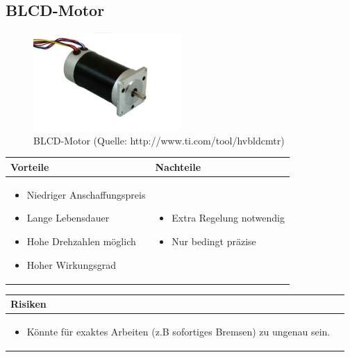 \pagebreak

\subsection{BLCD-Motor}

\begin{figure}[h!]%
\centering
\includegraphics[width=0.5\textwidth]{fig/blcd.jpg}
\caption{BLCD-Motor (Quelle: http://www.ti.com/tool/hvbldcmtr)}
\label{fig:Java}
\end{figure}

\begin{table}[h]
\begin{tabular}{p{} | p{}}


 \textbf{Vorteile} & \textbf{Nachteile} \\ \hline
	 
\begin{itemize}
\item Niedriger Anschaffungspreis
\item Lange Lebensdauer
\item Hohe Drehzahlen möglich
\item Hoher Wirkungsgrad
\end{itemize}

 
 &
 
\begin{itemize}
\item Extra Regelung notwendig
\item Nur bedingt präzise
\end{itemize}

\end{tabular}
\end{table}

\begin{table}[h]
\begin{tabular}{p{}p{}}


 \textbf{Risiken} & \\ \hline
	 
\begin{itemize}
\item Könnte für exaktes Arbeiten (z.B sofortiges Bremsen) zu ungenau sein.
\end{itemize}

 
\end{tabular}
\end{table}

\pagebreak